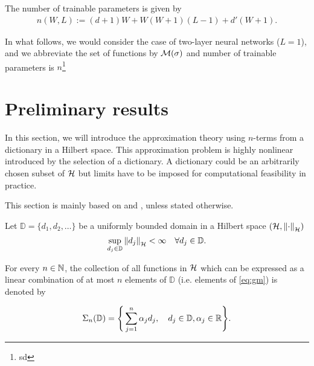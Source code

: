 The number of trainable parameters is given by 
\begin{align}
    n(W, L) := (d + 1)W + W(W + 1)(L - 1) + d'(W + 1).
\end{align}

In what follows, we would consider the case of two-layer neural networks
($L=1$), and we abbreviate the set of functions by $\mathcal{M}(\sigma)$ and number
of trainable parameters is $n$\footnote{
    sd
}


\section{Preliminary results}
\label{sec:preliminary}





In this section, we will introduce the approximation theory using $n$-terms from
a dictionary in a Hilbert space. This approximation problem is highly nonlinear
introduced by the selection of a dictionary. A dictionary could be an
arbitrarily chosen subset of $\mathcal{H}$ but limits have to be imposed for
computational feasibility in practice. 

This section is mainly based on \cite[Chapter 8]{devore_1998} and
\cite{vandervaartWeakConvergenceEmpirical1996}, unless stated otherwise.

Let $\mathbb{D} = \{d_1,d_2,\dots\}$ be a uniformly bounded domain in a Hilbert
space $(\mathcal{H}, \left\| \cdot \right\|_{\mathcal{H}})$
\begin{equation}
    \sup_{d_j\in \mathbb{D}} \left\| d_j \right\|_{\mathcal{H}} < \infty \quad 
    \forall d_j \in \mathbb{D}.
\end{equation}

For every $n \in \mathbb{N}$, the collection of all functions in $\mathcal{H}$
which can be expressed as a linear combination of at most $n$ elements of
$\mathbb{D}$ (i.e. elements of \eqref{eq:gm}) is denoted by

\begin{equation}
    \label{eq:dict_represent}
    \Sigma_n(\mathbb{D}) = \Bigg\{
        \sum_{j=1}^n \alpha_j d_j, \quad
        d_j \in \mathbb{D}, \alpha_j \in \mathbb{R}
    \Bigg\}.
\end{equation}

